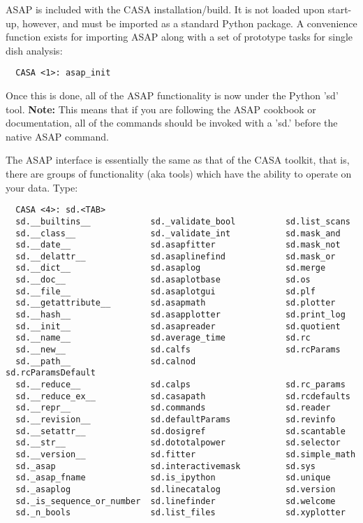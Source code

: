 ASAP is included with the CASA installation/build. It is not loaded
upon start-up, however, and must be imported as a standard Python
package. A convenience function exists for importing ASAP along with
a set of prototype tasks for single dish analysis:
\small
\begin{verbatim}
  CASA <1>: asap_init
\end{verbatim}
\normalsize
Once this is done, all of the ASAP functionality is now under the
Python 'sd' tool.  {\bf Note:} This means that if you are following
the ASAP cookbook or documentation, all of the commands should be 
invoked with a 'sd.' before the native ASAP command.

The ASAP interface is essentially the same as that
of the CASA toolkit, that is, there are groups of functionality (aka
tools) which have the ability to operate on your data. Type:

\small
\begin{verbatim}
  CASA <4>: sd.<TAB>
  sd.__builtins__            sd._validate_bool          sd.list_scans
  sd.__class__               sd._validate_int           sd.mask_and
  sd.__date__                sd.asapfitter              sd.mask_not
  sd.__delattr__             sd.asaplinefind            sd.mask_or
  sd.__dict__                sd.asaplog                 sd.merge
  sd.__doc__                 sd.asaplotbase             sd.os
  sd.__file__                sd.asaplotgui              sd.plf
  sd.__getattribute__        sd.asapmath                sd.plotter
  sd.__hash__                sd.asapplotter             sd.print_log
  sd.__init__                sd.asapreader              sd.quotient
  sd.__name__                sd.average_time            sd.rc
  sd.__new__                 sd.calfs                   sd.rcParams
  sd.__path__                sd.calnod                  sd.rcParamsDefault
  sd.__reduce__              sd.calps                   sd.rc_params
  sd.__reduce_ex__           sd.casapath                sd.rcdefaults
  sd.__repr__                sd.commands                sd.reader
  sd.__revision__            sd.defaultParams           sd.revinfo
  sd.__setattr__             sd.dosigref                sd.scantable
  sd.__str__                 sd.dototalpower            sd.selector
  sd.__version__             sd.fitter                  sd.simple_math
  sd._asap                   sd.interactivemask         sd.sys
  sd._asap_fname             sd.is_ipython              sd.unique
  sd._asaplog                sd.linecatalog             sd.version
  sd._is_sequence_or_number  sd.linefinder              sd.welcome
  sd._n_bools                sd.list_files              sd.xyplotter
\end{verbatim}
\normalsize

